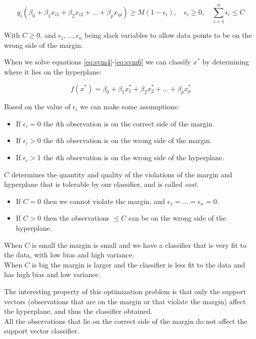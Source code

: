 \begin{equation} \label{eq:svm6}
y_i(\beta_0 + \beta_1 x_{i1} + \beta_2 x_{i2} + \dots + \beta_p x_{ip}) \ge M(1 - \epsilon_i), \quad \epsilon_i \ge 0, \quad \sum_{i=1}^{n}\epsilon_i \le C
\end{equation}

With $C \ge 0$, and $\epsilon_1, \dots, \epsilon_n$ being slack variables to allow data points to be on the wrong side of the margin.

When we solve equations \ref{eq:svm4}-\ref{eq:svm6} we can classify $x^*$ by determining where it lies on the hyperplane:

\begin{equation} \label{eq:svm7}
f(x^*) = \beta_0 + \beta_1 x_{1}^* + \beta_2 x_{2}^* + \dots + \beta_p x_{p}^*
\end{equation}

Based on the value of $\epsilon_i$ we can make some assumptions:
\begin{itemize}[noitemsep]
	\item If $\epsilon_i = 0$ the \textit{i}th observation is on the correct side of the margin.
	\item If $\epsilon_i > 0$ the \textit{i}th observation is on the wrong side of the margin.
	\item If $\epsilon_i > 1$ the \textit{i}th observation is on the wrong side of the hyperplane.
\end{itemize}

$C$ determines the quantity and quality of the violations of the margin and hyperplane that is tolerable by our classifier, and is called \textit{cost}.
\begin{itemize}[noitemsep]
	\item If $C = 0$ then we cannot violate the margin, and $\epsilon_1 = \dots = \epsilon_n = 0$.
	\item If $C > 0$ then the observations $\le C$ can be on the wrong side of the hyperplane.
\end{itemize} 

When $C$ is small the margin is small and we have a classifier that is very fit to the data, with low bias and high variance. \\
When $C$ is big the margin is larger and the classifier is less fit to the data and has high bias and low variance.

The interesting property of this optimization problem is that only the support vectors (observations that are on the margin or that violate the margin) affect the hyperplane, and thus the classifier obtained. \\
All the observations that lie on the correct side of the margin do not affect the support vector classifier.

